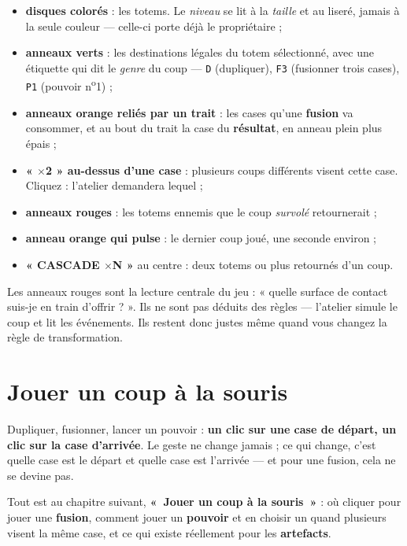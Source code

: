 \begin{itemize}
  \item \textbf{disques colorés} : les totems. Le \emph{niveau} se lit à la
        \emph{taille} et au liseré, jamais à la seule couleur — celle-ci porte
        déjà le propriétaire ;
  \item \textbf{anneaux verts} : les destinations légales du totem sélectionné,
        avec une étiquette qui dit le \emph{genre} du coup --- \texttt{D}
        (dupliquer), \texttt{F3} (fusionner trois cases), \texttt{P1}
        (pouvoir n\textsuperscript{o}1) ;
  \item \textbf{anneaux orange reliés par un trait} : les cases qu'une
        \textbf{fusion} va consommer, et au bout du trait la case du
        \textbf{résultat}, en anneau plein plus épais ;
  \item \textbf{« $\times$2 » au-dessus d'une case} : plusieurs coups
        différents visent cette case. Cliquez : l'atelier demandera lequel ;
  \item \textbf{anneaux rouges} : les totems ennemis que le coup \emph{survolé}
        retournerait ;
  \item \textbf{anneau orange qui pulse} : le dernier coup joué, une seconde
        environ ;
  \item \textbf{« CASCADE $\times$N »} au centre : deux totems ou plus retournés
        d'un coup.
\end{itemize}

Les anneaux rouges sont la lecture centrale du jeu : « quelle surface de contact
suis-je en train d'offrir ? ». Ils ne sont pas déduits des règles — l'atelier
simule le coup et lit les événements. Ils restent donc justes même quand vous
changez la règle de transformation.

\section{Jouer un coup à la souris}

Dupliquer, fusionner, lancer un pouvoir : \textbf{un clic sur une case de
départ, un clic sur la case d'arrivée}. Le geste ne change jamais ; ce qui
change, c'est quelle case est le départ et quelle case est l'arrivée --- et
pour une fusion, cela ne se devine pas.

Tout est au chapitre suivant, \textbf{«~Jouer un coup à la souris~»} : où
cliquer pour jouer une \textbf{fusion}, comment jouer un \textbf{pouvoir} et
en choisir un quand plusieurs visent la même case, et ce qui existe réellement
pour les \textbf{artefacts}.

